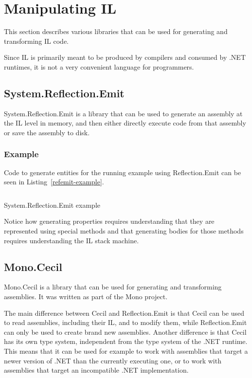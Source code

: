 
\section{Manipulating \acs{IL}}

This section describes various libraries that can be used for generating and transforming \ac{IL} code.

Since \ac{IL} is primarily meant to be produced by compilers and consumed by .NET runtimes, it is not a very convenient language for programmers.

\subsection{System.Reflection.Emit}

System.Reflection.Emit \cite{refemit} is a library that can be used to generate an assembly at the \ac{IL} level in memory, and then either directly execute code from that assembly or save the assembly to disk.

\subsubsection{Example}

Code to generate entities for the running example using Reflection.Emit can be seen in Listing~\ref{refemit-example}.

\begin{listing}
\inputminted[firstline=12,lastline=64]{csharp}{samples/ReflectionEmit/Program.cs}
\caption{System.Reflection.Emit example}
\label{refemit-example}
\end{listing}

Notice how generating properties requires understanding that they are represented using special methods and that generating bodies for those methods requires understanding the \ac{IL} stack machine.

\subsection{Mono.Cecil}
\label{cecil}

Mono.Cecil \cite{cecil} is a library that can be used for generating and transforming assemblies. It was written as part of the Mono project.

The main difference between Cecil and Reflection.Emit is that Cecil can be used to read assemblies, including their \ac{IL}, and to modify them, while Reflection.Emit can only be used to create brand new assemblies. Another difference is that Cecil has its own type system, independent from the type system of the .NET runtime. This means that it can be used for example to work with assemblies that target a newer version of .NET than the currently executing one, or to work with assemblies that target an incompatible .NET implementation.

